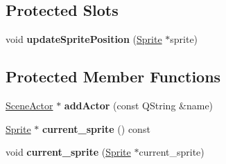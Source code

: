 \subsection*{Protected Slots}
\begin{DoxyCompactItemize}
\item 
\mbox{\label{class_main_window_a34e60652ff3e3db88a02ed27dd1b65f6}} 
void {\bfseries update\+Sprite\+Position} (\hyperlink{class_sprite}{Sprite} $\ast$sprite)
\end{DoxyCompactItemize}
\subsection*{Protected Member Functions}
\begin{DoxyCompactItemize}
\item 
\mbox{\label{class_main_window_abad7b29bc1e42b37a722bf063aab3512}} 
\hyperlink{class_actor}{Scene\+Actor} $\ast$ {\bfseries add\+Actor} (const Q\+String \&name)
\item 
\mbox{\label{class_main_window_a56886615b350cd30a42d70c4d35a29b0}} 
\hyperlink{class_sprite}{Sprite} $\ast$ {\bfseries current\+\_\+sprite} () const
\item 
\mbox{\label{class_main_window_ada53519efb7700c4bf59aee90334f95e}} 
void {\bfseries current\+\_\+sprite} (\hyperlink{class_sprite}{Sprite} $\ast$current\+\_\+sprite)
\end{DoxyCompactItemize}
